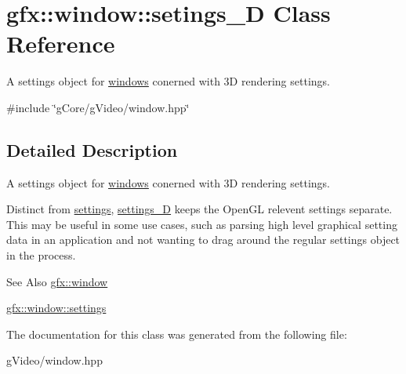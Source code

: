 \hypertarget{classgfx_1_1window_1_1setings__3D}{\section{gfx\-:\-:window\-:\-:setings\-\_\-D Class Reference}
\label{classgfx_1_1window_1_1setings__3D}
}


A settings object for \hyperlink{classgfx_1_1window}{windows} conerned with 3\-D rendering settings.  




{\ttfamily \#include \char`\"{}g\-Core/g\-Video/window.\-hpp\char`\"{}}



\subsection{Detailed Description}
A settings object for \hyperlink{classgfx_1_1window}{windows} conerned with 3\-D rendering settings. 

Distinct from \hyperlink{classgfx_1_1window_1_1settings}{settings}, \hyperlink{classgfx_1_1window_1_1settings__3D}{settings\-\_\-D} keeps the Open\-G\-L relevent settings separate. This may be useful in some use cases, such as parsing high level graphical setting data in an application and not wanting to drag around the regular settings object in the process. \begin{DoxySeeAlso}{See Also}
\hyperlink{classgfx_1_1window}{gfx\-::window} 

\hyperlink{classgfx_1_1window_1_1settings}{gfx\-::window\-::settings} 
\end{DoxySeeAlso}


The documentation for this class was generated from the following file\-:\begin{DoxyCompactItemize}
\item 
g\-Video/window.\-hpp\end{DoxyCompactItemize}
